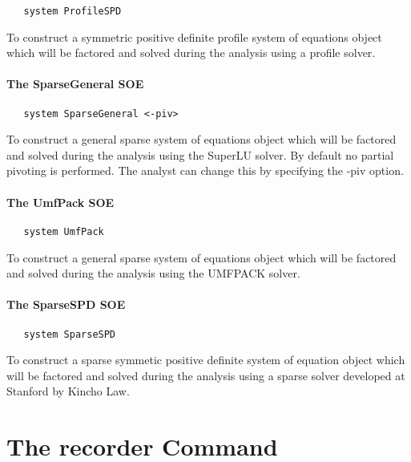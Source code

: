 \documentclass[12pt]{article}
\begin{document}
{\sf\small
\begin{verbatim}
   system ProfileSPD
\end{verbatim}
}

\noindent To construct a symmetric positive definite profile system of equations
object which will be factored and solved during the analysis using a
profile solver.

\paragraph{The SparseGeneral SOE}

{\sf\small
\begin{verbatim}
   system SparseGeneral <-piv>
\end{verbatim}
}

\noindent To construct a general sparse system of equations
object which will be factored and solved during the analysis using the
SuperLU solver. By default no partial pivoting is performed. The
analyst can change this by specifying the -piv option.

\paragraph{The UmfPack SOE}

{\sf\small
\begin{verbatim}
   system UmfPack 
\end{verbatim}
}

\noindent To construct a general sparse system of equations
object which will be factored and solved during the analysis using the
UMFPACK solver. \\

\paragraph{The SparseSPD SOE}

{\sf\small
\begin{verbatim}
   system SparseSPD
\end{verbatim}
}

\noindent To construct a sparse symmetic positive definite system of
equation object which will be factored and solved during the analysis
using a sparse solver developed at Stanford by Kincho Law.

\section {The recorder Command}
\end{document}
